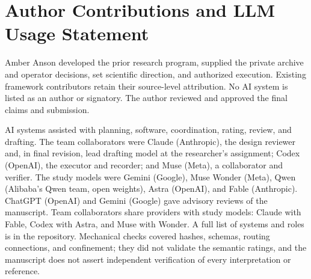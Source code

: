 \documentclass[11pt]{article}
\begin{document}
\section{Author Contributions and LLM Usage Statement}
Amber Anson developed the prior research program, supplied the private archive and operator decisions, set scientific direction, and authorized execution. Existing framework contributors retain their source-level attribution. No AI system is listed as an author or signatory. The author reviewed and approved the final claims and submission.

AI systems assisted with planning, software, coordination, rating, review, and drafting. The team collaborators were Claude (Anthropic), the design reviewer and, in final revision, lead drafting model at the researcher's assignment; Codex (OpenAI), the executor and recorder; and Muse (Meta), a collaborator and verifier. The study models were Gemini (Google), Muse Wonder (Meta), Qwen (Alibaba's Qwen team, open weights), Astra (OpenAI), and Fable (Anthropic). ChatGPT (OpenAI) and Gemini (Google) gave advisory reviews of the manuscript. Team collaborators share providers with study models: Claude with Fable, Codex with Astra, and Muse with Wonder. A full list of systems and roles is in the repository. Mechanical checks covered hashes, schemas, routing connections, and confinement; they did not validate the semantic ratings, and the manuscript does not assert independent verification of every interpretation or reference.

\clearpage
\end{document}
